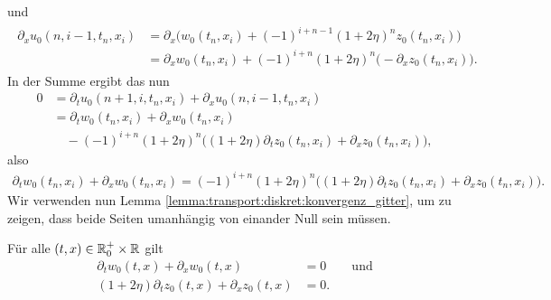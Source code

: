 und
\begin{align}
\begin{split}
\partial_x u_0(n, i-1, t_n, x_i) &= \partial_x \bigl( w_0(t_n, x_i) + (-1)^{i+n-1} (1 + 2\eta)^n z_0(t_n, x_i) \bigr)\\
&= \partial_x w_0(t_n, x_i) + (-1)^{i+n} (1 + 2\eta)^n \bigl( - \partial_x z_0(t_n, x_i) \bigr).
\end{split}
\end{align}
In der Summe ergibt das nun
\begin{align*}
0 &= \partial_t u_0(n+1, i, t_n, x_i) + \partial_x u_0(n, i-1, t_n, x_i)\\
&= \partial_t w_0(t_n, x_i) + \partial_x w_0(t_n, x_i)\\
&\quad - (-1)^{i+n} (1 + 2\eta)^n \bigl( (1 + 2 \eta) \partial_t z_0(t_n, x_i) + \partial_x z_0(t_n, x_i) \bigr),
\end{align*}
also
\begin{align}\label{eq:apx:beidenull}
\partial_t w_0(t_n, x_i) + \partial_x w_0(t_n, x_i) = (-1)^{i+n} (1 + 2\eta)^n \bigl( (1 + 2 \eta) \partial_t z_0(t_n, x_i) + \partial_x z_0(t_n, x_i) \bigr).
\end{align}
Wir verwenden nun Lemma \ref{lemma:transport:diskret:konvergenz_gitter}, um zu zeigen, dass beide Seiten umanhängig von einander Null sein müssen.
\begin{satz}
Für alle $(t, x) \in \mathbb R^+_0 \times \mathbb R$ gilt
\begin{align}\label{eq:apx:wgl}
\partial_t w_0(t, x) + \partial_x w_0(t, x) &= 0 \qquad \text{und}\\ 
(1 + 2 \eta) \partial_t z_0(t, x) + \partial_x z_0(t, x) &= 0. \label{eq:apx:zgl}
\end{align} 
\end{satz}
